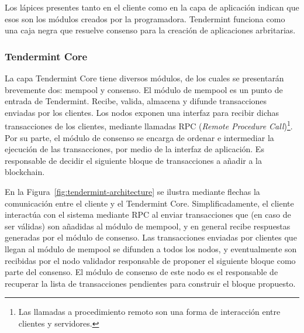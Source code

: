 Los lápices presentes tanto en el cliente como en la capa de aplicación indican que esos son los módulos creados
por la programadora.
%
Tendermint funciona como una caja negra que resuelve consenso para la creación de aplicaciones arbritarias.
%

\subsubsection{Tendermint Core}

La capa Tendermint Core tiene diversos módulos, de los cuales se presentarán brevemente dos: mempool y consenso.
%
El módulo de mempool es un punto de entrada de Tendermint.
%
Recibe, valida, almacena y difunde transacciones enviadas por los clientes. 
%
%
Los nodos exponen una interfaz para recibir dichas transacciones de los clientes, mediante llamadas
RPC (\textit{Remote Procedure Call})\footnote{Las llamadas a procedimiento remoto son una forma de
interacción entre clientes y servidores.}.
%
%
%
Por su parte, el módulo de consenso se encarga de ordenar e intermediar la ejecución de las transacciones, por medio de la
interfaz de aplicación. Es responsable de decidir el siguiente bloque de transacciones a añadir a la blockchain.

En la Figura~\ref{fig:tendermint-architecture} se ilustra mediante flechas la comunicación
entre el cliente y el Tendermint Core.
Simplificadamente, el cliente interactúa con el sistema mediante RPC al enviar transacciones
que (en caso de ser válidas) son añadidas al módulo de mempool,
y en general recibe respuestas generadas por el módulo de consenso.
Las transacciones enviadas por clientes que llegan al módulo de mempool se difunden a todos los nodos, y eventualmente son recibidas
por el nodo validador responsable de proponer el siguiente bloque como parte del consenso.
El módulo de consenso de este nodo es el responsable de recuperar la lista de transacciones pendientes
para construir el bloque propuesto. 


